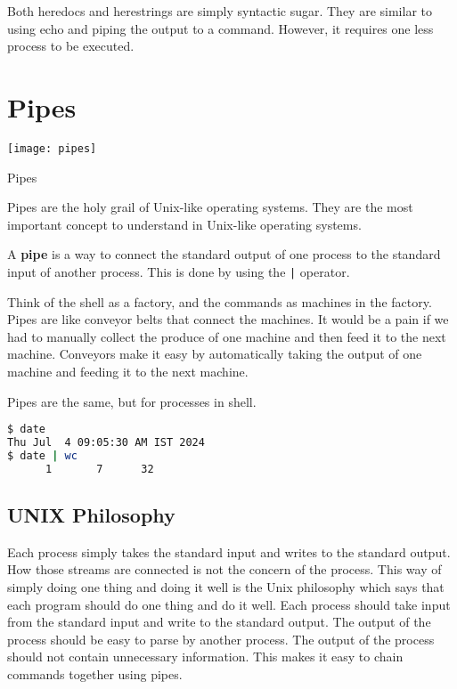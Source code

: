 \begin{remark}
  Both heredocs and herestrings are simply syntactic sugar. They are
  similar to using echo and piping the output to a command. However,
  it requires one less process to be executed.
\end{remark}

\section{Pipes}

\begin{marginfigure}
  \texttt{[image: pipes]}
  \caption{Pipes}
\end{marginfigure}

Pipes are the holy grail of Unix-like operating systems.
They are the most important concept to understand
in Unix-like operating systems.

\begin{definition}[Pipe]
  A \textbf{pipe} is a way to connect the standard output of one process
  to the standard input of another process. This is done by using the
  \texttt{|} operator.
\end{definition}

Think of the shell as a factory, and the commands as machines in the
factory. Pipes are like conveyor belts that connect the machines.
It would be a pain if we had to manually collect the produce of one
machine and then feed it to the next machine. Conveyors make it easy
by automatically taking the output of one machine and feeding it to
the next machine.

Pipes are the same, but for processes in shell.

\begin{lstlisting}[language=bash]
$ date
Thu Jul  4 09:05:30 AM IST 2024
$ date | wc
      1       7      32
\end{lstlisting}

\subsection{UNIX Philosophy}

Each process simply takes the standard input and writes to the standard
output. How those streams are connected is not the concern of the process.
This way of simply doing one thing and doing it well is the Unix philosophy
which says that each program should do one thing and do it well.
Each process should take input from the standard input and write to
the standard output. The output of the process should be easy to
parse by another process. The output of the process should not contain
unnecessary information. This makes it easy to chain commands together
using pipes.

